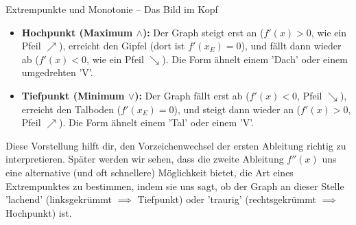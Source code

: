 \begin{tippumgebung}{Extrempunkte und Monotonie – Das Bild im Kopf}
\begin{itemize}
    \item \textbf{Hochpunkt (Maximum $\land$):} Der Graph steigt erst an ($f'(x)>0$, wie ein Pfeil $\nearrow$), erreicht den Gipfel (dort ist $f'(x_E)=0$), und fällt dann wieder ab ($f'(x)<0$, wie ein Pfeil $\searrow$). Die Form ähnelt einem 'Dach' oder einem umgedrehten 'V'.
    \item \textbf{Tiefpunkt (Minimum $\lor$):} Der Graph fällt erst ab ($f'(x)<0$, Pfeil $\searrow$), erreicht den Talboden ($f'(x_E)=0$), und steigt dann wieder an ($f'(x)>0$, Pfeil $\nearrow$). Die Form ähnelt einem 'Tal' oder einem 'V'.
\end{itemize}
Diese Vorstellung hilft dir, den Vorzeichenwechsel der ersten Ableitung richtig zu interpretieren. Später werden wir sehen, dass die zweite Ableitung $f''(x)$ uns eine alternative (und oft schnellere) Möglichkeit bietet, die Art eines Extrempunktes zu bestimmen, indem sie uns sagt, ob der Graph an dieser Stelle 'lachend' (linksgekrümmt $\implies$ Tiefpunkt) oder 'traurig' (rechtsgekrümmt $\implies$ Hochpunkt) ist.
\end{tippumgebung}

